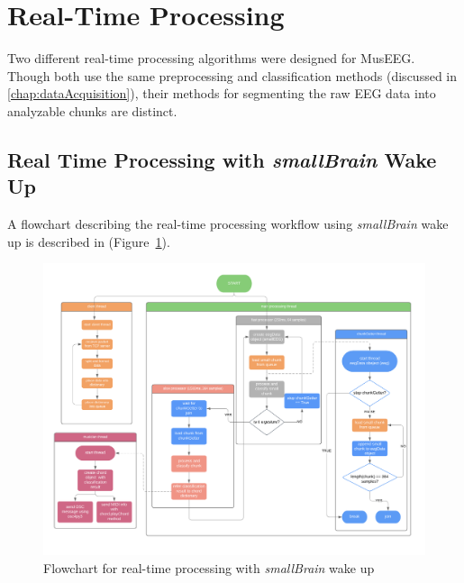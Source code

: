 \pagebreak
\section{Real-Time Processing}

Two different real-time processing algorithms were designed for MusEEG. Though both use the same preprocessing and classification methods (discussed in \autoref{chap:dataAcquisition}), their methods for segmenting the raw EEG data into analyzable chunks are distinct. 

\subsection{Real Time Processing with \textit{smallBrain} Wake Up}
A flowchart describing the real-time processing workflow using \textit{smallBrain} wake up is described in (Figure~\ref{fig:realTimeFlowChart}).
 
 \begin{figure}[H]
	\centering
		\includegraphics[width=1\columnwidth]{realTimeFlowChart.png}
	\caption{Flowchart for real-time processing with \textit{smallBrain} wake up}
	\label{fig:realTimeFlowChart}
\end{figure} 

\pagebreak

